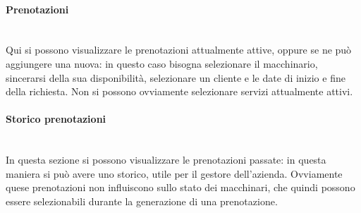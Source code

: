 \paragraph{Prenotazioni}
~\\Qui si possono visualizzare le prenotazioni attualmente attive, oppure se ne può aggiungere una nuova: in questo caso bisogna selezionare il macchinario, sincerarsi della sua disponibilità, selezionare un cliente e le date di inizio e fine della richiesta. Non si possono ovviamente selezionare servizi attualmente attivi.
\paragraph{Storico prenotazioni}
~\\In questa sezione si possono visualizzare le prenotazioni passate: in questa maniera si può avere uno storico, utile per il gestore dell'azienda. Ovviamente quese prenotazioni non influiscono sullo stato dei macchinari, che quindi possono essere selezionabili durante la generazione di una prenotazione.











